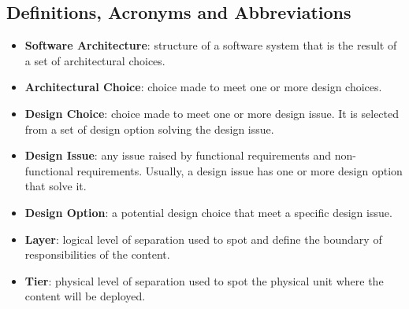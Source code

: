 \subsection{Definitions, Acronyms and Abbreviations}

\begin{itemize}
	\item \textbf{Software Architecture}: structure of a software system that is the result of a set of architectural choices.
	\item \textbf{Architectural Choice}: choice made to meet one or more design choices.
	\item \textbf{Design Choice}: choice made to meet one or more design issue. It is selected from a set of design option solving the design issue.
	\item \textbf{Design Issue}: any issue raised by functional requirements and non-functional requirements. Usually, a design issue has one or more design option that solve it.
	\item \textbf{Design Option}: a potential design choice that meet a specific design issue.
	\item \textbf{Layer}: logical level of separation used to spot and define the boundary of responsibilities of the content.
	\item \textbf{Tier}: physical level of separation used to spot the physical unit where the content will be deployed.
\end{itemize}
